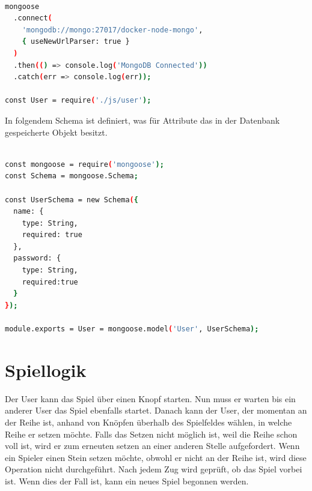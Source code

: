 \begin{lstlisting}[language=bash, caption={Verbindungsaufbau mit der MongoDB}, label=lis:POST]

mongoose
  .connect(
    'mongodb://mongo:27017/docker-node-mongo',
    { useNewUrlParser: true }
  )
  .then(() => console.log('MongoDB Connected'))
  .catch(err => console.log(err));

const User = require('./js/user');

\end{lstlisting}

In folgendem Schema ist definiert, was für Attribute das in der Datenbank gespeicherte Objekt besitzt. 

\begin{lstlisting}[language=bash, caption={Datenschema in der MongoDB}, label=lis:POST]

const mongoose = require('mongoose');
const Schema = mongoose.Schema;

const UserSchema = new Schema({
  name: {
    type: String,
    required: true
  },
  password: {
    type: String,
    required:true
  }
});

module.exports = User = mongoose.model('User', UserSchema);

\end{lstlisting}

\section{Spiellogik}\label{sec:Spiellogik}
Der User kann das Spiel über einen Knopf starten. Nun muss er warten bis ein anderer User das Spiel ebenfalls startet. Danach kann der User, der momentan an der Reihe ist, anhand von Knöpfen überhalb des Spielfeldes wählen, in welche Reihe er setzen möchte. Falls das Setzen nicht möglich ist, weil die Reihe schon voll ist, wird er zum erneuten setzen an einer anderen Stelle aufgefordert. Wenn ein Spieler einen Stein setzen möchte, obwohl er nicht an der Reihe ist, wird diese Operation nicht durchgeführt. Nach jedem Zug wird geprüft, ob das Spiel vorbei ist. Wenn dies der Fall ist, kann ein neues Spiel begonnen werden.

